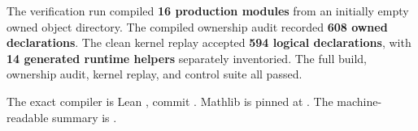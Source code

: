 The verification run compiled \textbf{16 production modules} from an initially empty owned object directory. The compiled ownership audit recorded \textbf{608 owned declarations}. The clean kernel replay accepted \textbf{594 logical declarations}, with \textbf{14 generated runtime helpers} separately inventoried. The full build, ownership audit, kernel replay, and control suite all passed.

The exact compiler is Lean , commit . Mathlib is pinned at . The machine-readable summary is .

